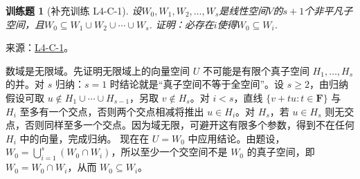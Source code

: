 \documentclass[UTF8,12pt,a4paper,fontset=fandol]{ctexart}
\newtheorem{exercise}{训练题}[section]
\begin{document}
\begin{exercise}[补充训练 L4-C-1]\label{prob:L4-C-1}
设$W_0,W_1,W_2,\ldots,W_s$是线性空间$V$的$s+1$个非平凡子空间，且$W_0 \subseteq W_1 \cup W_2 \cup \cdots \cup W_s$. 证明：必存在$i$使得$W_0\subseteq W_i$.
\end{exercise}
\noindent 来源：\href{https://github.com/yhwu-is/Linear-Algebra-Left-Undone/blob/new/%E8%AE%B2%E4%B9%89/%E4%B8%93%E9%A2%98/4%20%E7%BA%BF%E6%80%A7%E7%A9%BA%E9%97%B4%E7%9A%84%E8%BF%90%E7%AE%97.tex}{L4-C-1}。
\begin{solve}
数域是无限域。先证明无限域上的向量空间 $U$ 不可能是有限个真子空间 $H_1,\ldots,H_s$ 的并。对 $s$ 归纳：$s=1$ 时结论就是“真子空间不等于全空间”。设 $s\ge2$，由归纳假设可取 $u\notin H_1\cup\cdots\cup H_{s-1}$，另取 $v\notin H_s$。对 $i<s$，直线 $\{v+tu:t\in\mathbf F\}$ 与 $H_i$ 至多有一个交点，否则两个交点相减将推出 $u\in H_i$。对 $H_s$，若 $u\in H_s$ 则无交点，否则同样至多一个交点。因为域无限，可避开这有限多个参数，得到不在任何 $H_i$ 中的向量，完成归纳。
现在在 $U=W_0$ 中应用结论。由题设，$W_0=\bigcup_{i=1}^s(W_0\cap W_i)$，所以至少一个交空间不是 $W_0$ 的真子空间，即 $W_0=W_0\cap W_i$，从而 $W_0\subseteq W_i$。
\end{solve}
\end{document}
